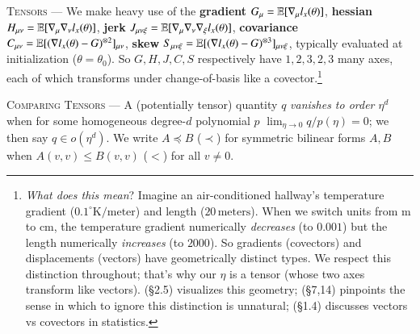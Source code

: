 
            \textsc{Tensors} --- We make heavy use of the %
            \textbf{gradient} $G_\mu = \mathbb{E}[\nabla_\mu l_x(\theta)]$, %
            \textbf{hessian} $H_{\mu\nu} = \mathbb{E}[\nabla_\mu\nabla_\nu l_x(\theta)]$, %
            \textbf{jerk} \squish $J_{\mu\nu\xi} = \mathbb{E}[\nabla_\mu\nabla_\nu\nabla_\xi l_x(\theta)]$, %
            \textbf{covariance} $C_{\mu\nu} = \mathbb{E}[(\nabla l_x(\theta) - G)^{\otimes 2}]_{\mu\nu}$, %
            \textbf{skew} \squash $S_{\mu\nu\xi} = \mathbb{E}[(\nabla l_x(\theta) - G)^{\otimes 3}]_{\mu\nu\xi}$, %
            \squash typically evaluated at
            initialization ($\theta=\theta_0$).
            So $G, H, J, C, S$ respectively have $1, 2, 3, 2, 3$ many axes, each of which
            transforms under change-of-basis like a covector.\footnote{
                \emph{What does this mean}?  Imagine an air-conditioned
                hallway's temperature gradient ($0.1^\circ
                \text{K}/\text{meter}$) and length ($20\,\text{meters}$).
                When we switch units from m to cm, the temperature
                gradient numerically \emph{decreases} (to $0.001$) but the length
                numerically \emph{increases} (to $2000$).  So gradients
                (covectors) and displacements (vectors) have geometrically
                distinct types.  We respect this distinction throughout; that's
                why our $\eta$ is a tensor (whose two axes transform like
                vectors).
                \cite{mi73} (\S2.5) visualizes this geometry; \cite{ko93}
                (\S7,14) pinpoints the sense in which to ignore this distinction
                is unnatural; \cite{cu87} (\S1.4) discusses vectors vs covectors
                in statistics.
            }

            \textsc{Comparing Tensors} --- A (potentially tensor)
            quantity $q$ \emph{vanishes to order $\eta^d$} when
            for some homogeneous degree-$d$ polynomial $p$
            $\lim_{\eta\to 0} q/p(\eta) = 0$; we then say $q\in o(\eta^d)$.
            We write $A \preceq B$ ($\prec$) for symmetric bilinear forms $A,
            B$ when $A(v,v) \leq B(v,v)$ ($<$) for all $v\neq 0$. 

